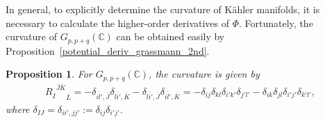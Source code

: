 \documentclass[10pt,a4paper]{amsart}
\numberwithin{equation}{section}
\newtheorem{Proposition}[Theorem]{Proposition}
 { \theoremstyle{definition}
\newtheorem{Definition}[Theorem]{Definition}
\newtheorem{Note}[Theorem]{Note}
\newtheorem{Example}[Theorem]{Example}
\newtheorem{Remark}[Theorem]{Remark} }
\begin{document}
In general, to explicitly determine the curvature
of K\"ahler manifolds, it is necessary to calculate the higher-order derivatives of $\Phi$.
Fortunately, the curvature of
$ G_{p,p+q}(\mathbb{C})$
can be obtained easily by Proposition~\ref{potential_deriv_grassmann_2nd}.
\begin{Proposition}\label{curv_grassmann}
For $G_{p,p+q}(\mathbb{C})$, the curvature  is given by
\begin{align*}
 {{R_{\overline{I}}}^{\overline{J}\overline{K}}}_{\overline{L}}
 =
 -
 \delta_{
 \overline{il'},
 \overline{J}
 }
 \delta_{
 \overline{li'},
 \overline{K}
 }
 -
 \delta_{
 \overline{li'},
 \overline{J}
 }
 \delta_{
 \overline{il'},
 \overline{K}
 }
 =
 -
 \delta_{ij}
 \delta_{kl}
 \delta_{i'k'}
 \delta_{j'l'}
 -
 \delta_{ik}
 \delta_{jl}
 \delta_{i'j'}
 \delta_{k'l'},
\end{align*}
where $\delta_{IJ}=\delta_{ii',jj'}:=\delta_{ij}\delta_{i'j'}$.
\end{Proposition}
\end{document}
